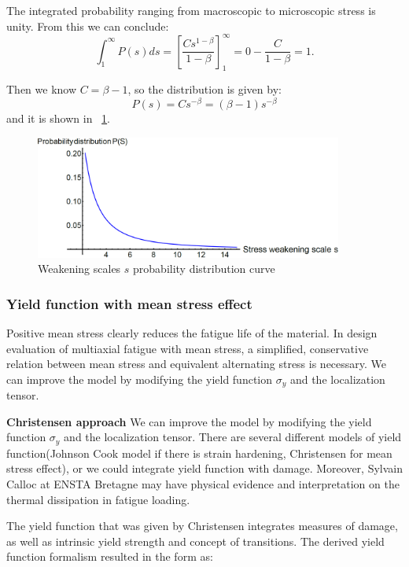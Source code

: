 \documentclass[3p,times,procedia,number]{elsarticle}
\newcommand{\figref}[1]{\figurename~\ref{#1}}
\begin{document}
The integrated probability ranging from macroscopic to microscopic stress  is unity. From this we can conclude:
$$\int_{1}^{\infty}P(s)ds=\left[ \frac{Cs^{1-\beta}}{1-\beta}\right] _{1}^{\infty}=0-\frac{C}{1-\beta}=1.$$


Then we know $C=\beta-1$, so the distribution is given by:
$$P(s) = Cs^{-\beta}=(\beta-1)s^{-\beta}$$ and it is shown in \figref{ps}.
\begin{figure}[!h]
	\centering
	\includegraphics[width=0.9\textwidth]{figures//ps.png} 
	\caption{Weakening scales $s$ probability distribution curve}
	\label{ps}
\end{figure}


\subsubsection{Yield function with mean stress effect}

Positive mean stress clearly reduces the fatigue life of the material. In design evaluation of multiaxial fatigue with mean stress, a simplified, conservative relation between mean stress and equivalent alternating stress is necessary. We can improve the model by modifying the yield function $\sigma_y$ and the localization tensor.

\textbf{Christensen approach}
We can improve the model by modifying the yield function $\sigma_y$ and the localization tensor. There are several different models of yield function(Johnson Cook model if there is strain hardening, Christensen for mean stress effect), or we could integrate yield function with damage. Moreover, Sylvain Calloc at ENSTA Bretagne may have physical evidence and interpretation on the thermal dissipation in fatigue loading. 

The yield function that was given by Christensen\cite{christensen2000yield} integrates measures of damage, as well as intrinsic yield strength and concept of transitions. The derived yield function formalism resulted in the form as:
\end{document}
